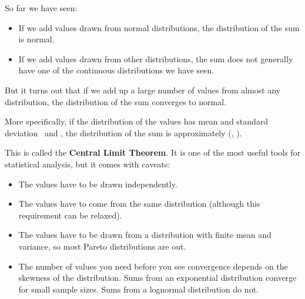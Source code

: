 \documentclass[12pt]{book}
\begin{document}
So far we have seen:

\begin{itemize}

\item If we add values drawn from normal distributions, the distribution
of the sum is normal.

\item If we add values drawn from other distributions, the sum does not
generally have one of the continuous distributions we have seen.

\end{itemize}

But it turns out that if we add up a large number of values from
almost any distribution, the distribution of the sum converges to
normal.

More specifically, if the distribution of the values has mean and
standard deviation \mymu~and \mysigma, the distribution of the sum is
approximately \mynormal(\n \mymu, \n \sigmasq).

This is called the {\bf Central Limit Theorem}.  It is one of the
most useful tools for statistical analysis, but it comes with
caveats:

\begin{itemize}

\item The values have to be drawn independently.

\item The values have to come from the same distribution (although
  this requirement can be relaxed).

\item The values have to be drawn
  from a distribution with finite mean and variance, so most Pareto
  distributions are out.

\item The number of values you need before you see convergence depends
  on the skewness of the distribution.  Sums from an exponential
  distribution converge for small sample sizes.  Sums from a
  lognormal distribution do not.

\end{itemize}
\end{document}

